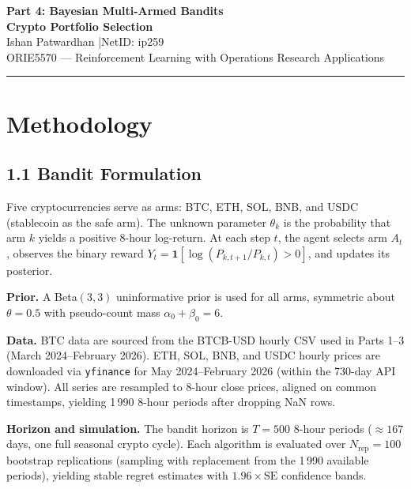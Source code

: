 \documentclass[11pt, letterpaper]{article}
\begin{document}
\begin{center}
  {\LARGE\bfseries Part 4: Bayesian Multi-Armed Bandits\\[4pt]
  Crypto Portfolio Selection}\\[8pt]
  {\large Ishan Patwardhan \quad|\quad NetID: ip259}\\[4pt]
  {\large ORIE5570 --- Reinforcement Learning with Operations Research Applications}
\end{center}
\vspace{6pt}\hrule\vspace{12pt}

\section{Methodology}

\subsection{1.1 Bandit Formulation}

Five cryptocurrencies serve as arms: BTC, ETH, SOL, BNB, and USDC (stablecoin as the safe
arm). The unknown parameter $\theta_k$ is the probability that arm $k$ yields a positive
8-hour log-return. At each step $t$, the agent selects arm $A_t$, observes the binary
reward $Y_t = \mathbf{1}[\log(P_{k,t+1}/P_{k,t})>0]$, and updates its posterior.

\textbf{Prior.} A Beta$(3,3)$ uninformative prior is used for all arms, symmetric about
$\theta = 0.5$ with pseudo-count mass $\alpha_0 + \beta_0 = 6$.

\textbf{Data.} BTC data are sourced from the BTCB-USD hourly CSV used in Parts 1--3
(March 2024--February 2026). ETH, SOL, BNB, and USDC hourly prices are downloaded via
\texttt{yfinance} for May 2024--February 2026 (within the 730-day API window). All series
are resampled to 8-hour close prices, aligned on common timestamps, yielding 1\,990
8-hour periods after dropping NaN rows.

\textbf{Horizon and simulation.} The bandit horizon is $T = 500$ 8-hour periods
($\approx 167$ days, one full seasonal crypto cycle). Each algorithm is evaluated over
$N_\text{rep} = 100$ bootstrap replications (sampling with replacement from the 1\,990
available periods), yielding stable regret estimates with $1.96 \times \text{SE}$ confidence
bands.
\end{document}

